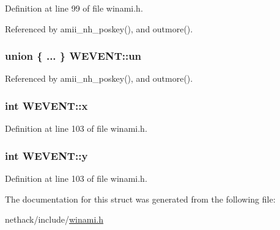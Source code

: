 Definition at line 99 of file winami.\+h.



Referenced by amii\+\_\+nh\+\_\+poskey(), and outmore().

\hypertarget{structWEVENT_aa1fde3395f49a17259c056ec58ffc1e9}{
\subsubsection[{un}]{\setlength{\rightskip}{0pt plus 5cm}union \{ ... \}   W\+E\+V\+E\+N\+T\+::un}}\label{structWEVENT_aa1fde3395f49a17259c056ec58ffc1e9}


Referenced by amii\+\_\+nh\+\_\+poskey(), and outmore().

\hypertarget{structWEVENT_a29084caaf7aed001d9903b674186bcf2}{
\subsubsection[{x}]{\setlength{\rightskip}{0pt plus 5cm}int W\+E\+V\+E\+N\+T\+::x}}\label{structWEVENT_a29084caaf7aed001d9903b674186bcf2}


Definition at line 103 of file winami.\+h.

\hypertarget{structWEVENT_acdf2e5c197cee7c096f0dbf0d75d93e5}{
\subsubsection[{y}]{\setlength{\rightskip}{0pt plus 5cm}int W\+E\+V\+E\+N\+T\+::y}}\label{structWEVENT_acdf2e5c197cee7c096f0dbf0d75d93e5}


Definition at line 103 of file winami.\+h.



The documentation for this struct was generated from the following file\+:\begin{DoxyCompactItemize}
\item 
nethack/include/\hyperlink{winami_8h}{winami.\+h}\end{DoxyCompactItemize}
